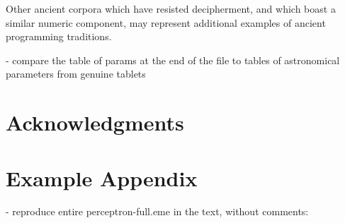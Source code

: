 \documentclass[11pt]{article}
\begin{document}
Other ancient corpora which have resisted decipherment, and which boast a similar numeric component, may represent additional examples of ancient programming traditions.

- compare the table of params at the end of the file to tables of astronomical parameters from genuine tablets


\section*{Acknowledgments}



\appendix

\section{Example Appendix}
\label{sec:appendix}

- reproduce entire perceptron-full.eme in the text, without comments:

\onecolumn
\tiny
\noindent

\normalsize
\end{document}
